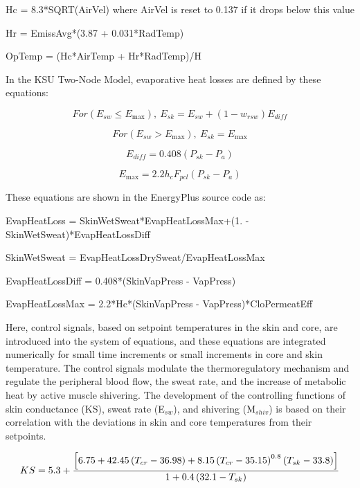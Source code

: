 Hc = 8.3*SQRT(AirVel) where AirVel is reset to 0.137 if it drops below this value

Hr = EmissAvg*(3.87 + 0.031*RadTemp)

OpTemp = (Hc*AirTemp + Hr*RadTemp)/H

In the KSU Two-Node Model, evaporative heat losses are defined by these equations:

\begin{equation}
For \left({E_{sw}} \le {E_{\max }}\right),~{E_{sk}} = {E_{sw}} + (1 - {w_{rsw}}){E_{diff}}
\end{equation}

\begin{equation}
For \left({E_{sw}} > {E_{\max }}\right),~{E_{sk}} = {E_{\max }}
\end{equation}

\begin{equation}
{E_{diff}} = 0.408({P_{sk}} - {P_a})
\end{equation}

\begin{equation}
{E_{\max }} = 2.2{h_c}{F_{pcl}}({P_{sk}} - {P_a})
\end{equation}

These equations are shown in the EnergyPlus source code as:

EvapHeatLoss = SkinWetSweat*EvapHeatLossMax+(1. - SkinWetSweat)*EvapHeatLossDiff

SkinWetSweat = EvapHeatLossDrySweat/EvapHeatLossMax

EvapHeatLossDiff = 0.408*(SkinVapPress - VapPress)

EvapHeatLossMax = 2.2*Hc*(SkinVapPress - VapPress)*CloPermeatEff

Here, control signals, based on setpoint temperatures in the skin and core, are introduced into the system of equations, and these equations are integrated numerically for small time increments or small increments in core and skin temperature. The control signals modulate the thermoregulatory mechanism and regulate the peripheral blood flow, the sweat rate, and the increase of metabolic heat by active muscle shivering. The development of the controlling functions of skin conductance (KS), sweat rate (E\(_{sw}\)), and shivering (M\(_{shiv}\)) is based on their correlation with the deviations in skin and core temperatures from their setpoints.

\begin{equation}
KS = 5.3 + \frac{\left[6.75+42.45\left(T_{cr}-36.98\right)+8.15\left(T_{cr}-35.15\right)^{0.8}\left(T_{sk}-33.8\right)\right]}{1+0.4\left(32.1-T_{sk}\right)}
\end{equation}


